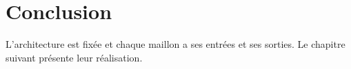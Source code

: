 












\section*{Conclusion}

L'architecture est fixée et chaque maillon a ses entrées et ses sorties. Le chapitre suivant présente leur réalisation.
